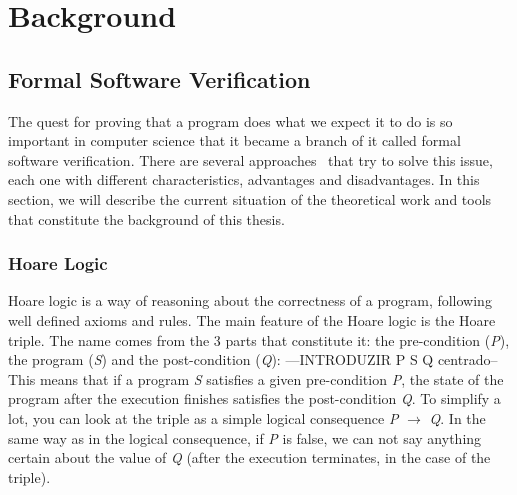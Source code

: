 
%

\chapter{Background}
\label{cha:background}

\glsresetall


\section{Formal Software Verification}
\label{sec:formal_software_verification}

The quest for proving that a program does what we expect it to do is so important in computer science that it became a branch of it called formal software verification. 
There are several approaches~\cite{DBLP:conf/fm/BrainP24} that try to solve this issue, each one with different characteristics, advantages and disadvantages. 
In this section, we will describe the current situation of the theoretical work and tools that constitute the background of this thesis.


\subsection{Hoare Logic} 
\label{sub:hoare_logic}

Hoare logic is a way of reasoning about the correctness of a program, following well defined axioms and rules.
The main feature of the Hoare logic is the Hoare triple. 
The name comes from the 3 parts that constitute it: the pre-condition (\emph{P}), the program (\emph{S}) and the post-condition (\emph{Q}):
---INTRODUZIR {P} S {Q} centrado--
This means that if a program \emph{S} satisfies a given pre-condition \emph{P}, the state of the program after the execution finishes satisfies the post-condition \emph{Q}.
To simplify a lot, you can look at the triple as a simple logical consequence \emph{P} $\rightarrow$ \emph{Q}.
In the same way as in the logical consequence, if \emph{P} is false, we can not say anything certain about the value of \emph{Q} (after the execution terminates, in the case of the triple).

